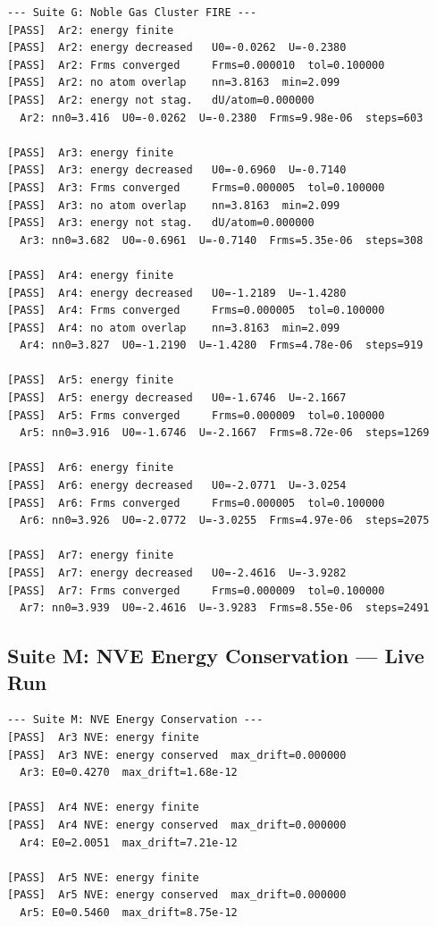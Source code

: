 \documentclass[11pt,twoside]{article}
\begin{document}
\begin{lstlisting}[language={}, basicstyle=\ttfamily\scriptsize, frame=single,
  caption={Suite G FIRE output (verbatim from \texttt{deep\_verification --verbose})}]
--- Suite G: Noble Gas Cluster FIRE ---
[PASS]  Ar2: energy finite
[PASS]  Ar2: energy decreased   U0=-0.0262  U=-0.2380
[PASS]  Ar2: Frms converged     Frms=0.000010  tol=0.100000
[PASS]  Ar2: no atom overlap    nn=3.8163  min=2.099
[PASS]  Ar2: energy not stag.   dU/atom=0.000000
  Ar2: nn0=3.416  U0=-0.0262  U=-0.2380  Frms=9.98e-06  steps=603

[PASS]  Ar3: energy finite
[PASS]  Ar3: energy decreased   U0=-0.6960  U=-0.7140
[PASS]  Ar3: Frms converged     Frms=0.000005  tol=0.100000
[PASS]  Ar3: no atom overlap    nn=3.8163  min=2.099
[PASS]  Ar3: energy not stag.   dU/atom=0.000000
  Ar3: nn0=3.682  U0=-0.6961  U=-0.7140  Frms=5.35e-06  steps=308

[PASS]  Ar4: energy finite
[PASS]  Ar4: energy decreased   U0=-1.2189  U=-1.4280
[PASS]  Ar4: Frms converged     Frms=0.000005  tol=0.100000
[PASS]  Ar4: no atom overlap    nn=3.8163  min=2.099
  Ar4: nn0=3.827  U0=-1.2190  U=-1.4280  Frms=4.78e-06  steps=919

[PASS]  Ar5: energy finite
[PASS]  Ar5: energy decreased   U0=-1.6746  U=-2.1667
[PASS]  Ar5: Frms converged     Frms=0.000009  tol=0.100000
  Ar5: nn0=3.916  U0=-1.6746  U=-2.1667  Frms=8.72e-06  steps=1269

[PASS]  Ar6: energy finite
[PASS]  Ar6: energy decreased   U0=-2.0771  U=-3.0254
[PASS]  Ar6: Frms converged     Frms=0.000005  tol=0.100000
  Ar6: nn0=3.926  U0=-2.0772  U=-3.0255  Frms=4.97e-06  steps=2075

[PASS]  Ar7: energy finite
[PASS]  Ar7: energy decreased   U0=-2.4616  U=-3.9282
[PASS]  Ar7: Frms converged     Frms=0.000009  tol=0.100000
  Ar7: nn0=3.939  U0=-2.4616  U=-3.9283  Frms=8.55e-06  steps=2491
\end{lstlisting}

\subsection{Suite M: NVE Energy Conservation --- Live Run}

\begin{lstlisting}[language={}, basicstyle=\ttfamily\scriptsize, frame=single,
  caption={Suite M NVE output (verbatim, seed \texttt{1772952709})}]
--- Suite M: NVE Energy Conservation ---
[PASS]  Ar3 NVE: energy finite
[PASS]  Ar3 NVE: energy conserved  max_drift=0.000000
  Ar3: E0=0.4270  max_drift=1.68e-12

[PASS]  Ar4 NVE: energy finite
[PASS]  Ar4 NVE: energy conserved  max_drift=0.000000
  Ar4: E0=2.0051  max_drift=7.21e-12

[PASS]  Ar5 NVE: energy finite
[PASS]  Ar5 NVE: energy conserved  max_drift=0.000000
  Ar5: E0=0.5460  max_drift=8.75e-12
\end{lstlisting}
\end{document}
